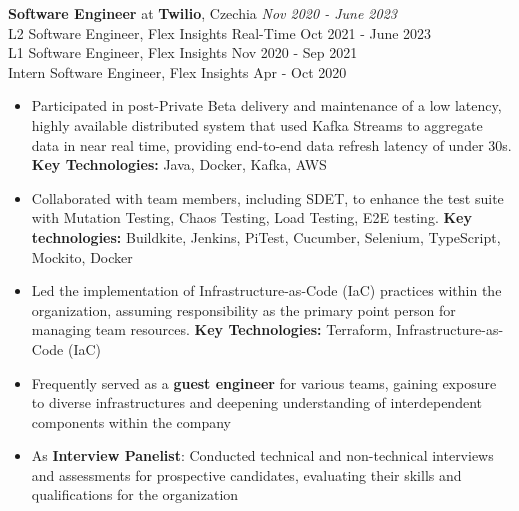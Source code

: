{\textbf{Software Engineer} at \textbf{Twilio}, Czechia} 
    \hfill {\em Nov 2020 - June 2023}\\
    {L2 Software Engineer, Flex Insights Real-Time} \hfill  {Oct 2021 - June 2023}\\
    {L1 Software Engineer, Flex Insights} \hfill            {Nov 2020 - Sep 2021}\\
    {Intern Software Engineer, Flex Insights} \hfill        {Apr - Oct 2020}
    \begin{itemize}
        \item Participated in post-Private Beta delivery and maintenance of a low latency, highly available distributed system that used Kafka Streams to aggregate data in near real time, providing end-to-end data refresh latency of under 30s. \textbf{Key Technologies:} Java, Docker, Kafka, AWS
        \item Collaborated with team members, including SDET, to enhance the test suite with Mutation Testing, Chaos Testing, Load Testing, E2E testing. \textbf{Key technologies:} Buildkite, Jenkins, PiTest, Cucumber, Selenium, TypeScript, Mockito, Docker
        \item Led the implementation of Infrastructure-as-Code (IaC) practices within the organization, assuming responsibility as the primary point person for managing team resources. \textbf{Key Technologies:} Terraform, Infrastructure-as-Code (IaC)
        \item Frequently served as a \textbf{guest engineer} for various teams, gaining exposure to diverse infrastructures and deepening understanding of interdependent components within the company
        \item As \textbf{Interview Panelist}: Conducted technical and non-technical interviews and assessments for prospective candidates, evaluating their skills and qualifications for the organization
    \end{itemize}